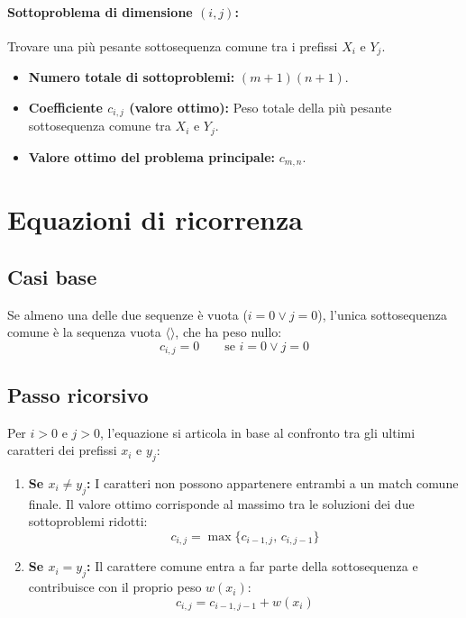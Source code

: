 \paragraph{Sottoproblema di dimensione $(i, j)$:} Trovare una più pesante sottosequenza comune tra i prefissi $X_i$ e $Y_j$.
\begin{itemize}
    \item \textbf{Numero totale di sottoproblemi:} $(m+1)(n+1)$.
    \item \textbf{Coefficiente $c_{i,j}$ (valore ottimo):} Peso totale della più pesante sottosequenza comune tra $X_i$ e $Y_j$.
    \item \textbf{Valore ottimo del problema principale:} $c_{m,n}$.
\end{itemize}

\section{Equazioni di ricorrenza}

\subsection{Casi base}
Se almeno una delle due sequenze è vuota ($i = 0 \lor j = 0$), l'unica sottosequenza comune è la sequenza vuota $\langle \rangle$, che ha peso nullo:
\begin{equation}
    c_{i,j} = 0 \qquad \text{se } i = 0 \lor j = 0
\end{equation}

\subsection{Passo ricorsivo}
Per $i > 0$ e $j > 0$, l'equazione si articola in base al confronto tra gli ultimi caratteri dei prefissi $x_i$ e $y_j$:
\begin{enumerate}
    \item \textbf{Se $x_i \ne y_j$:} I caratteri non possono appartenere entrambi a un match comune finale. Il valore ottimo corrisponde al massimo tra le soluzioni dei due sottoproblemi ridotti:
    \begin{equation}
        c_{i,j} = \max\{c_{i-1,j}, \, c_{i,j-1}\}
    \end{equation}
    \item \textbf{Se $x_i = y_j$:} Il carattere comune entra a far parte della sottosequenza e contribuisce con il proprio peso $w(x_i)$:
    \begin{equation}
        c_{i,j} = c_{i-1,j-1} + w(x_i)
    \end{equation}
\end{enumerate}

